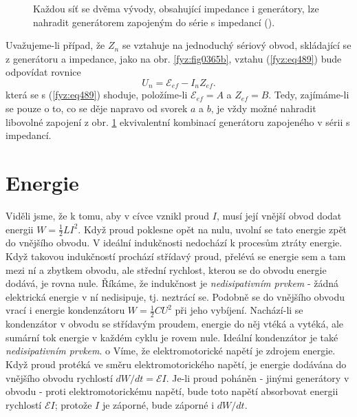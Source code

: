   \begin{figure}[hb!] %
    \centering
    \caption{Každou síť se dvěma vývody, obsahující impedance i generátory, lze nahradit 
             generátorem zapojeným do série s impedancí
             (\cite[s.~405]{Feynman02}).}
    \label{fyz:fig0365}
  \end{figure}

  Uvažujeme-li případ, že \(Z_n\) se vztahuje na jednoduchý sériový obvod, skládající se z 
  generátoru a impedance, jako na obr. \ref{fyz:fig0365b}, vztahu (\ref{fyz:eq489}) bude odpovídat 
  rovnice 
  \begin{equation*}
    U_n = \mathscr{E}_{ef} - I_nZ_{ef}.
  \end{equation*}
  která se s (\ref{fyz:eq489}) shoduje, položíme-li \(\mathscr{E}_{ef} = A\) a \(Z_{ef}= B\). Tedy, 
  zajímáme-li se pouze o to, co se děje napravo od svorek \(a\) a \(b\), je vždy možné nahradit 
  libovolné zapojení z obr. \ref{fyz:fig0365} ekvivalentní kombinací generátoru zapojeného v sérii s 
  impedancí.
  
\section{Energie}\label{fyz:IIchapXXIIsecV}
  Viděli jsme, že k tomu, aby v cívce vznikl proud \(I\), musí její vnější obvod dodat energii \(W= 
  \frac{1}{2}LI^2\). Když proud poklesne opět na nulu, uvolní se tato energie zpět do vnějšího 
  obvodu. V ideální indukčnosti nedochází k procesům ztráty energie. Když takovou indukčností 
  prochází střídavý proud, přelévá se energie sem a tam mezi ní a zbytkem obvodu, ale střední 
  rychlost, kterou se do obvodu energie dodává, je rovna nule. Říkáme, že indukčnost je 
  \emph{nedisipativním prvkem} - žádná elektrická energie v ní nedisipuje, tj. neztrácí se. Podobně 
  se do vnějšího obvodu vrací i energie kondenzátoru \(W= \frac{1}{2}CU^2\) při jeho vybíjení. 
  Nachází-li se kondenzátor v obvodu se střídavým proudem, energie do něj vtéká a vytéká, ale 
  sumární tok energie v každém cyklu je rovem nule. Ideální kondenzátor je také 
  \emph{nedisipativním prvkem}. o Víme, že elektromotorické napětí je zdrojem energie. Když proud 
  protéká ve směru elektromotorického napětí, je energie dodávána do vnějšího obvodu rychlostí 
  \(dW/dt =\mathscr{E}I\). Je-li proud poháněn - jinými generátory v obvodu - proti 
  elektromotorickému napětí, bude toto napětí absorbovat energii rychlostí \(\mathscr{E}I\); 
  protože \(I\) je záporné, bude záporné i \(dW/dt\).

